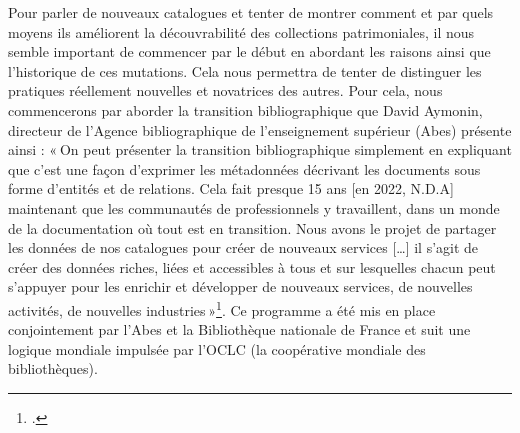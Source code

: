 Pour parler de nouveaux catalogues et tenter de montrer comment et par quels moyens ils améliorent la découvrabilité des collections patrimoniales, il nous semble important de commencer par le début en abordant les raisons ainsi que l’historique de ces mutations. Cela nous permettra de tenter de distinguer les pratiques réellement nouvelles et novatrices des autres. Pour cela, nous commencerons par aborder la transition bibliographique que David Aymonin, directeur de l’Agence bibliographique de l’enseignement supérieur (Abes) présente ainsi : « On peut présenter la transition bibliographique simplement en expliquant que c’est une façon d’exprimer les métadonnées décrivant les documents sous forme d’entités et de relations. Cela fait presque 15 ans [en 2022, N.D.A] maintenant que les communautés de professionnels y travaillent, dans un monde de la documentation où tout est en transition. Nous avons le projet de partager les données de nos catalogues pour créer de nouveaux services […] il s’agit de créer des données riches, liées et accessibles à tous et sur lesquelles chacun peut s’appuyer pour les enrichir et développer de nouveaux services, de nouvelles activités, de nouvelles industries »\footcite[§3 et §4]{carre-marillonnet_transition_2022}. Ce programme a été mis en place conjointement par l’Abes et la Bibliothèque nationale de France et suit une logique mondiale impulsée par l’OCLC (la coopérative mondiale des bibliothèques).

